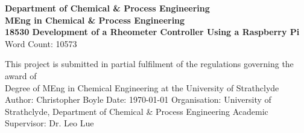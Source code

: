 \documentclass[twoside,a4]{report}
\def\atitle{Development of a Rheometer Controller Using a Raspberry Pi}
\def\thewords{10573} %
\begin{document}
	\begin{titlepage}
		\centering
		\vskip3cm
		{
			\bfseries\Large
			Department of Chemical \& Process Engineering\\
			\vskip1cm
			MEng in Chemical \& Process Engineering\\
			18530
			\vskip3cm
			\LARGE\atitle
		}
		\vskip3cm
		{\small Word Count: \thewords}
		\vskip1cm
		\begin{flushleft}
			This project is submitted in partial fulfilment of the regulations governing the award of \\
			Degree of MEng in Chemical Engineering at the University of Strathclyde
			\vskip2cm
			Author: Christopher Boyle \hfill Date: \today \newline
			\vskip1cm
			Organisation: University of Strathclyde, Department of Chemical \& Process Engineering \newline
			Academic Supervisor: Dr. Leo Lue
		\end{flushleft}
	\end{titlepage}
\end{document}
